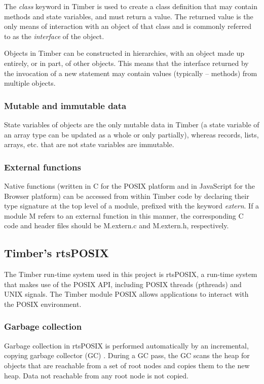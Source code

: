 \documentclass[a4paper]{article}
\begin{document}
The \textit{class} keyword in Timber is used to create a class definition that may contain methods and state variables, and must return a value. The returned value is the only means of interaction with an object of that class and is commonly referred to as the \textit{interface} of the object.

Objects in Timber can be constructed in hierarchies, with an object made up entirely, or in part, of other objects. This means that the interface returned by the invocation of a new statement may contain values (typically -- methods) from multiple objects.

\subsubsection*{Mutable and immutable data}
State variables of objects are the only mutable data in Timber (a state variable of an array type can be updated as a whole or only partially), whereas records, lists, arrays, etc. that are not state variables are immutable.

\subsubsection*{External functions}
Native functions (written in C for the POSIX platform and in JavaScript for the Browser platform) can be accessed from within Timber code by declaring their type signature at the top level of a module, prefixed with the keyword \textit{extern}. If a module M refers to an external function in this manner, the corresponding C code and header files should be M.extern.c and M.extern.h, respectively.

\subsection{Timber's rtsPOSIX}
The Timber run-time system used in this project is rtsPOSIX, a run-time system that makes use of the POSIX API, including POSIX threads (pthreads) and UNIX signals. The Timber module POSIX  allows applications to interact with the POSIX environment.

\subsubsection*{Garbage collection}
Garbage collection in rtsPOSIX is performed automatically by an incremental, copying garbage collector (GC)  \cite{kero1, kero2}. During a GC pass, the GC scans the heap for objects that are reachable from a set of root nodes and copies them to the new heap. Data not reachable from any root node is not copied.
\end{document}
